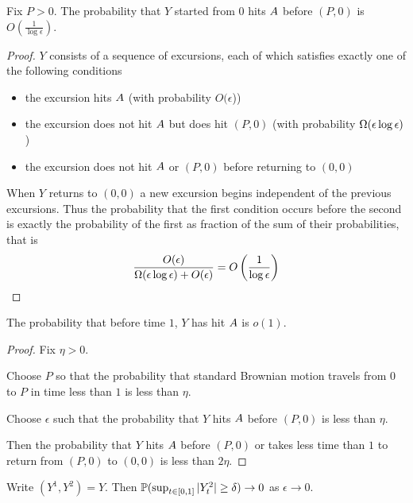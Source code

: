 {\begin{lemma}
  Fix $P > 0$.  The probability that $Y$ started from $0$ hits
  $\boundarylines$ before $(P,0)$ is $O(\frac{1}{\log\epsilon})$.
\end{lemma}

\newcommand{\Oe}{O(\epsilon)}

\begin{proof}
  $Y$ consists of a sequence of excursions, each of which satisfies
  exactly one of the following conditions
  \begin{itemize}
  \item the excursion hits $\boundarylines$ (with probability
    $O(\epsilon$))
  \item the excursion does not hit $\boundarylines$ but does hit
    $(P,0)$ (with probability $\Omegaeloge$)
  \item the excursion does not hit $\boundarylines$ or $(P,0)$ before
    returning to $(0,0)$
  \end{itemize}
  When $Y$ returns to $(0,0)$ a new excursion begins independent of
  the previous excursions.  Thus the probability that the first
  condition occurs before the second is exactly the probability of the
  first as fraction of the sum of their probabilities, that is
  \[
  \frac{\Oe}{\Omegaeloge + \Oe} = O\left(\frac{1}{\log\epsilon}\right)
  \]
\end{proof}

\begin{lemma}
  The probability that before time $1$, $Y$ has hit $\boundarylines$
  is $o(1)$.
\end{lemma}

\begin{proof}
  Fix $\eta > 0$.

  Choose $P$ so that the probability that standard Brownian motion
  travels from $0$ to $P$ in time less than $1$ is less than
  $\eta$.

  Choose $\epsilon$ such that the probability that $Y$ hits
  $\boundarylines$ before $(P,0)$ is less than $\eta$.

  Then the probability that $Y$ hits $\boundarylines$ before $(P,0)$
  or takes less time than $1$ to return from $(P,0)$ to $(0,0)$ is
  less than $2\eta$.
\end{proof}

\begin{lemma}
  Write $(Y^1, Y^2) = Y$.  Then $\P(\sup_{t \in [0,1]} |Y^2_t| \ge
  \delta) \to 0$ as $\epsilon \to 0$.
\end{lemma}

}
